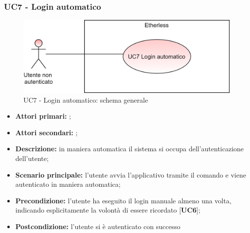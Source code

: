 \subsubsection{UC7 - Login automatico}
\begin{figure}[H]
	\centering
	\includegraphics[scale=\ucs]{./res/img/UC7G.png}
	\caption {UC7 - Login automatico: schema generale}
\end{figure}
\begin{itemize}
	\item \textbf{Attori primari:} \una{};
	\item \textbf{Attori secondari:} \re{};
	\item \textbf{Descrizione:} in maniera automatica il sistema si occupa dell’autenticazione dell’utente;
	\item \textbf{Scenario principale:} l’utente avvia l'applicativo tramite il comando \init{} e viene autenticato in maniera automatica; 
	\item \textbf{Precondizione:} l’utente ha eseguito il login manuale almeno una volta, indicando esplicitamente la volontà di essere ricordato [\textbf{UC6}];
	\item \textbf{Postcondizione:} l’utente si è autenticato con successo
\end{itemize}
